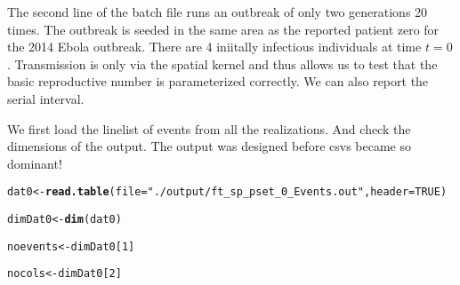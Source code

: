 \documentclass{article}\usepackage[]{graphicx}\usepackage[]{color}
\makeatletter
\newcommand{\hlnum}[1]{\textcolor[rgb]{0.686,0.059,0.569}{#1}}%
\newcommand{\hlstr}[1]{\textcolor[rgb]{0.192,0.494,0.8}{#1}}%
\newcommand{\hlstd}[1]{\textcolor[rgb]{0.345,0.345,0.345}{#1}}%
\newcommand{\hlkwb}[1]{\textcolor[rgb]{0.69,0.353,0.396}{#1}}%
\newcommand{\hlkwc}[1]{\textcolor[rgb]{0.333,0.667,0.333}{#1}}%
\newcommand{\hlkwd}[1]{\textcolor[rgb]{0.737,0.353,0.396}{\textbf{#1}}}%
\newenvironment{kframe}{%
 \def\at@end@of@kframe{}%
 \ifinner\ifhmode%
  \def\at@end@of@kframe{\end{minipage}}%
  \begin{minipage}{\columnwidth}%
 \fi\fi%
 \def\FrameCommand##1{\hskip\@totalleftmargin \hskip-\fboxsep
 \colorbox{shadecolor}{##1}\hskip-\fboxsep
     \hskip-\linewidth \hskip-\@totalleftmargin \hskip\columnwidth}%
 \MakeFramed {\advance\hsize-\width
   \@totalleftmargin\z@ \linewidth\hsize
   \@setminipage}}%
 {\par\unskip\endMakeFramed%
 \at@end@of@kframe}
\newenvironment{knitrout}{}{} %
\makeatother
\begin{document}

The second line of the batch file runs an outbreak of only two generations 20
times. The outbreak is seeded in the same area as the reported patient zero for
the 2014 Ebola outbreak. There are 4 iniitally infectious individuals at time
$t=0$. Transmission is only via the spatial kernel and thus allows us to test
that the basic reproductive number is parameterized correctly. We can also
report the serial interval. 

%

We first load the linelist of events from all the realizations. And check the
dimensions of the output. The output was designed before csvs became so
dominant!

\begin{knitrout}
\color{fgcolor}\begin{kframe}
\begin{alltt}
\hlstd{dat0} \hlkwb{<-} \hlkwd{read.table}\hlstd{(}\hlkwc{file}\hlstd{=}\hlstr{"./output/ft_sp_pset_0_Events.out"}\hlstd{,}\hlkwc{header}\hlstd{=}\hlnum{TRUE}\hlstd{)}
\end{alltt}


{\ttfamily\noindent\bfseries{}}\begin{alltt}
\hlstd{dimDat0} \hlkwb{<-} \hlkwd{dim}\hlstd{(dat0)}
\end{alltt}


{\ttfamily\noindent\bfseries\color{errorcolor}{\#\# Error in eval(expr, envir, enclos): object 'dat0' not found}}\begin{alltt}
\hlstd{noevents} \hlkwb{<-} \hlstd{dimDat0[}\hlnum{1}\hlstd{]}
\end{alltt}


{\ttfamily\noindent\bfseries\color{errorcolor}{\#\# Error in eval(expr, envir, enclos): object 'dimDat0' not found}}\begin{alltt}
\hlstd{nocols} \hlkwb{<-} \hlstd{dimDat0[}\hlnum{2}\hlstd{]}
\end{alltt}


{\ttfamily\noindent\bfseries\color{errorcolor}{\#\# Error in eval(expr, envir, enclos): object 'dimDat0' not found}}\end{kframe}
\end{knitrout}
\end{document}
